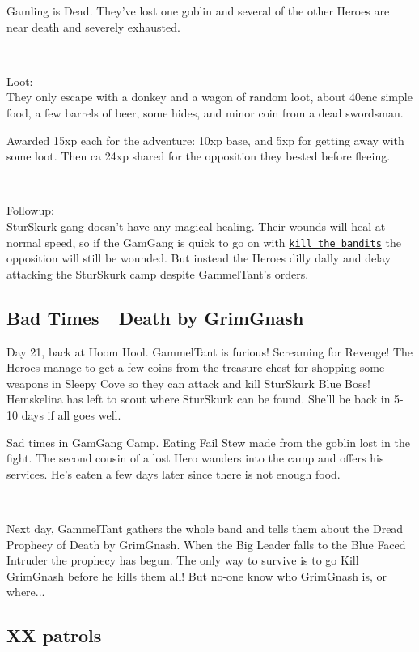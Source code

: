 Gamling is Dead. They've lost one goblin and several of the other Heroes are near death and severely exhausted.

\

Loot:\\
They only escape with a donkey and a wagon of random loot, about 40enc simple food, a few barrels of beer, some hides, and minor coin from a dead swordsman.

Awarded 15xp each for the adventure: 10xp base, and 5xp for getting away with some loot. Then ca 24xp shared for the opposition they bested before fleeing.

\

Followup:\\
SturSkurk gang doesn't have any magical healing. Their wounds will heal at normal speed, so if the GamGang is quick to go on with \hyperref[02killthebandits]{\texttt{kill the bandits}} the opposition will still be wounded. But instead the Heroes dilly dally and delay attacking the SturSkurk camp despite GammelTant's orders.


\subsection*{Bad Times~\mdash~Death by GrimGnash}

Day 21, back at Hoom Hool. GammelTant is furious! Screaming for Revenge! The Heroes manage to get a few coins from the treasure chest for shopping some weapons in Sleepy Cove so they can attack and kill SturSkurk Blue Boss! Hemskelina has left to scout where SturSkurk can be found. She'll be back in 5-10 days if all goes well.

Sad times in GamGang Camp. Eating Fail Stew made from the goblin lost in the fight. The second cousin of a lost Hero wanders into the camp and offers his services. He's eaten a few days later since there is not enough food.

\

Next day, GammelTant gathers the whole band and tells them about the Dread Prophecy of Death by GrimGnash. When the Big Leader falls to the Blue Faced Intruder the prophecy has begun. The only way to survive is to go Kill GrimGnash before he kills them all! But no-one know who GrimGnash is, or where...


\subsection*{XX patrols} 

